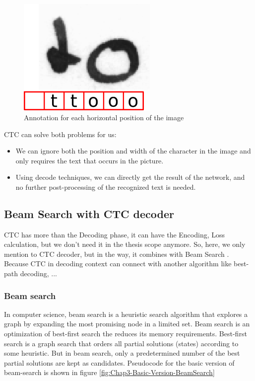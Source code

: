 \begin{figure}[H]
	\centering
	\includegraphics[width=0.6\textwidth]{img/Chap3/Annotation-image-CTC}
	\caption{ Annotation for each horizontal position of the image }
	\label{fig:Chap3-Annottion-image-CTC}
\end{figure}

CTC can solve both problems for us:
\begin{itemize}
	\item We can ignore both the position and width of the character in the image and only requires the text that occurs in the picture.
	\item Using decode techniques, we can directly get the result of the network, and no further post-processing of the recognized text is needed.
\end{itemize}

\subsection{Beam Search with CTC decoder}
CTC has more than the Decoding phase, it can have the Encoding, Loss calculation, but we don't need it in the thesis scope anymore. So, here, we only mention to CTC decoder, but in the way, it combines with Beam Search \cite{scheidl2018word}. Because CTC in decoding context can connect with another algorithm like best-path decoding, ...

\subsubsection{Beam search}

In computer science, beam search \cite{BeamSearch} is a heuristic search algorithm that explores a graph by expanding the most promising node in a limited set. Beam search is an optimization of best-first search the reduces its memory requirements. Best-first search is a graph search that orders all partial solutions (states) according to some heuristic. But in beam search, only a predetermined number of the best partial solutions are kept as candidates. Pseudocode for the basic version of beam-search is shown in figure \ref{fig:Chap3-Basic-Version-BeamSearch}

